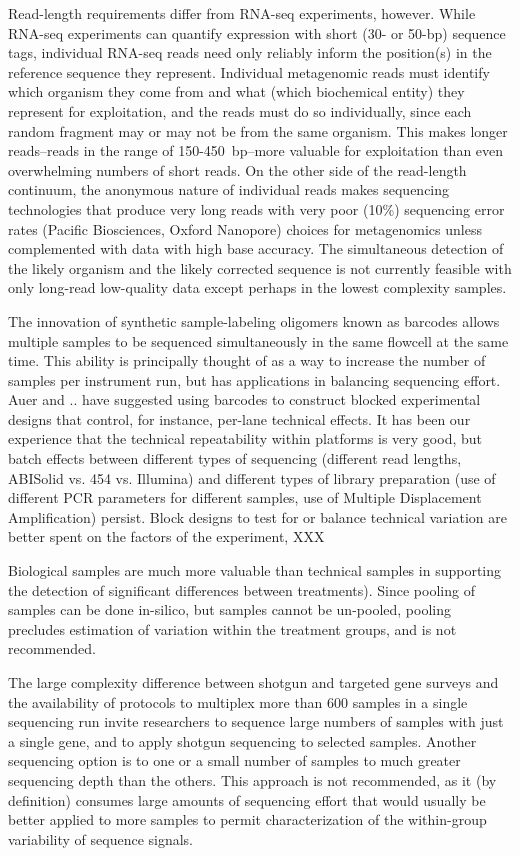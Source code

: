 \documentclass[graybox]{svmult}
\begin{document}
Read-length requirements differ from RNA-seq experiments, however.   While RNA-seq experiments can quantify expression with short (30- or 50-bp) sequence tags,  individual RNA-seq reads need only reliably inform the position(s) in the reference sequence they represent.   Individual metagenomic reads must identify which organism they come from and what (which biochemical entity) they represent for exploitation, and the reads must do so individually, since each random fragment may or may not be from the same organism.  This makes longer reads--reads in the range of 150-450~bp--more valuable for exploitation than even overwhelming numbers of short reads.   On the other side of the read-length continuum, the anonymous nature of individual reads makes sequencing technologies that produce very long reads with very poor (10\%) sequencing error rates (Pacific Biosciences, Oxford Nanopore) choices for metagenomics unless complemented with data with high base accuracy.  The simultaneous detection of the likely organism and the likely corrected sequence is not currently feasible with only long-read low-quality data except perhaps in the lowest complexity samples.

The innovation of synthetic sample-labeling oligomers known as barcodes allows multiple samples to be sequenced simultaneously in the same flowcell at the same time.  This ability is principally thought of as a way to increase the number of samples per instrument run, but has applications in balancing sequencing effort.    Auer and ..   have suggested using barcodes to construct blocked experimental designs that control, for instance, per-lane technical effects.   It has been our experience that the technical repeatability within platforms is very good, but batch effects between different types of sequencing (different read lengths, ABISolid vs. 454 vs. Illumina) and different types of library preparation (use of different PCR parameters for different samples, use of Multiple Displacement Amplification) persist.  Block designs to test for or balance technical variation are better spent on the factors of the experiment,  XXX

Biological samples are much more valuable than technical samples in supporting the detection of significant differences between treatments).  Since pooling of samples can be done in-silico, but samples cannot be un-pooled, pooling precludes estimation of variation within the treatment groups, and is not recommended.

The large complexity difference between shotgun and targeted gene surveys and the availability of protocols to multiplex more than 600 samples in a single sequencing run invite researchers to sequence large numbers of samples with just a single gene, and to apply shotgun sequencing to selected samples.   Another sequencing option is to one or a small number of samples to much greater sequencing depth than the others.  This approach is not recommended, as it (by definition) consumes large amounts of sequencing effort that would usually be better applied to more samples to permit characterization of the within-group variability of sequence signals.
\end{document}

